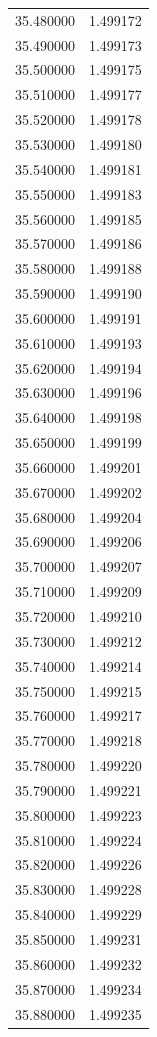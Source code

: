 \begin{tabular}{rr}
35.480000 & 1.499172 \\
35.490000 & 1.499173 \\
35.500000 & 1.499175 \\
35.510000 & 1.499177 \\
35.520000 & 1.499178 \\
35.530000 & 1.499180 \\
35.540000 & 1.499181 \\
35.550000 & 1.499183 \\
35.560000 & 1.499185 \\
35.570000 & 1.499186 \\
35.580000 & 1.499188 \\
35.590000 & 1.499190 \\
35.600000 & 1.499191 \\
35.610000 & 1.499193 \\
35.620000 & 1.499194 \\
35.630000 & 1.499196 \\
35.640000 & 1.499198 \\
35.650000 & 1.499199 \\
35.660000 & 1.499201 \\
35.670000 & 1.499202 \\
35.680000 & 1.499204 \\
35.690000 & 1.499206 \\
35.700000 & 1.499207 \\
35.710000 & 1.499209 \\
35.720000 & 1.499210 \\
35.730000 & 1.499212 \\
35.740000 & 1.499214 \\
35.750000 & 1.499215 \\
35.760000 & 1.499217 \\
35.770000 & 1.499218 \\
35.780000 & 1.499220 \\
35.790000 & 1.499221 \\
35.800000 & 1.499223 \\
35.810000 & 1.499224 \\
35.820000 & 1.499226 \\
35.830000 & 1.499228 \\
35.840000 & 1.499229 \\
35.850000 & 1.499231 \\
35.860000 & 1.499232 \\
35.870000 & 1.499234 \\
35.880000 & 1.499235 \\

\end{tabular}
